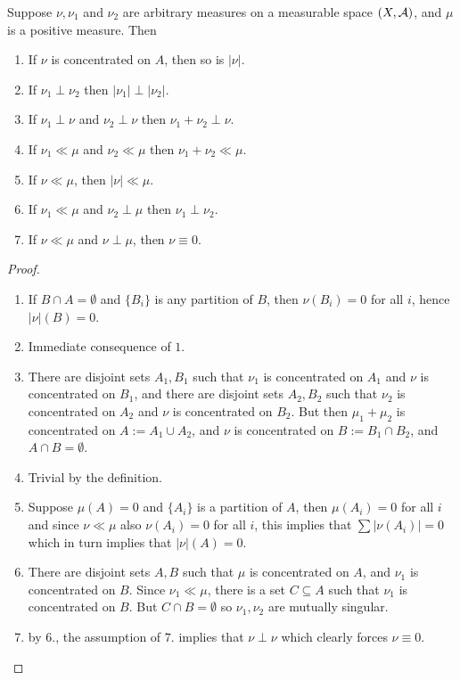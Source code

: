 \begin{proposition}\label{prop: abs cont properties}
Suppose $\nu, \nu_{1}$ and $\nu_{2}$ are arbitrary measures on a measurable space $(X, \mathcal{A})$, and $\mu$ is a positive measure. Then
\begin{enumerate}
\item If $\nu$ is concentrated on $A$, then so is $|\nu|$.
\item If $\nu_{1} \perp \nu_{2}$ then $|\nu_{1}| \perp |\nu_{2}|$.
\item If $\nu_{1} \perp \nu$ and $\nu_{2} \perp \nu$ then $\nu_{1} + \nu_{2} \perp \nu$.
\item If $\nu_{1} \ll \mu$ and $\nu_{2} \ll \mu$ then $\nu_{1} + \nu_{2} \ll \mu$.
\item If $\nu \ll \mu$, then $|\nu|\ll \mu$.
\item If $\nu_{1}\ll \mu$ and $\nu_{2} \perp \mu$ then $\nu_{1} \perp \nu_{2}$.
\item If $\nu \ll \mu$ and $\nu \perp \mu$, then $\nu \equiv 0$.
\end{enumerate}
\end{proposition}
\begin{proof}
\begin{enumerate}
\item If $B\cap A=\emptyset$ and $\{B_{i}\}$ is any partition of $B$, then $\nu(B_{i})=0$ for all $i$, hence $|\nu|(B)=0$.
\item Immediate consequence of $1.$
\item There are disjoint sets $A_{1},B_{1}$ such that $\nu_{1}$ is concentrated on $A_{1}$ and $\nu$ is concentrated on $B_{1}$, and there are disjoint sets $A_{2},B_{2}$ such that $\nu_{2}$ is concentrated on $A_{2}$ and $\nu$ is concentrated on $B_{2}$. But then $\mu_{1}+\mu_{2}$ is concentrated on $A:=A_{1} \cup A_{2}$, and $\nu$ is concentrated on $B:=B_{1} \cap B_{2}$, and $A\cap B= \emptyset$.
\item Trivial by the definition.
\item Suppose $\mu(A)=0$ and $\{A_{i}\}$ is a partition of $A$, then $\mu(A_{i})=0$ for all $i$ and since $\nu\ll \mu$ also $\nu(A_{i})=0$ for all $i$, this implies that $\sum|\nu(A_{i})|=0$ which in turn implies that $|\nu|(A)=0$.
\item There are disjoint sets $A, B$ such that $\mu$ is concentrated on $A$, and $\nu_{1}$ is concentrated on $B$. Since $\nu_{1} \ll \mu$, there is a set $C\subseteq A$ such that $\nu_{1}$ is concentrated on $B$. But $C\cap B=\emptyset$ so $\nu_{1}, \nu_{2}$ are mutually singular.
\item by $6.$, the assumption of $7.$ implies that $\nu \perp \nu$ which clearly forces $\nu \equiv 0$.
\end{enumerate}
\end{proof}

